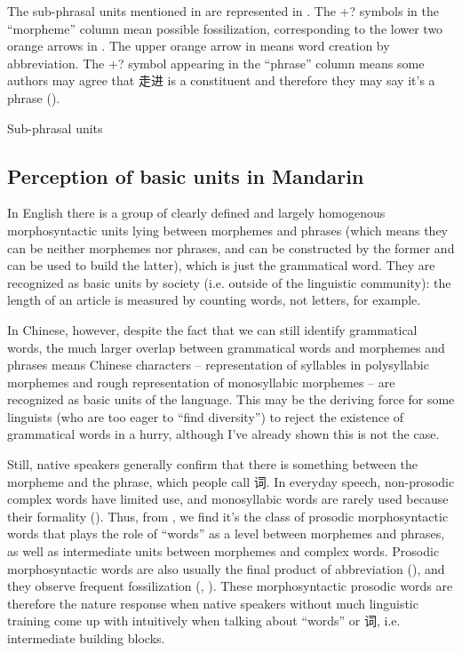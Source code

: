 \documentclass[UTF8, a4paper, oneside, scheme=plain, 12pt]{ctexrep}
\begin{document}
The sub-phrasal units mentioned in 
are represented in .
The +? symbols in the ``morpheme'' column 
mean possible fossilization, 
corresponding to the lower two orange arrows in .
The upper orange arrow in 
means word creation by abbreviation. 
The +? symbol appearing in the ``phrase'' column 
means some authors may agree that 走进 is a constituent 
and therefore they may say it's a phrase
().

\begin{sidewaystable}
    \centering
    \caption{Sub-phrasal units}
    \label{tbl:sub-phrasal-units}
    
\end{sidewaystable}

\subsection{Perception of basic units in Mandarin}\label{sec:pos.word.perception}

In English there is a group of clearly defined and largely homogenous morphosyntactic units 
lying between morphemes and phrases
(which means they can be neither morphemes nor phrases,
and can be constructed by the former and can be used to build the latter),
which is just the grammatical word.
They are recognized as basic units by society 
(i.e. outside of the linguistic community):
the length of an article is measured by counting words, not letters, for example.

In Chinese, however, despite the fact that 
we can still identify grammatical words,
the much larger overlap between grammatical words and morphemes and phrases
means Chinese characters -- representation of syllables in polysyllabic morphemes 
and rough representation of monosyllabic morphemes -- 
are recognized as basic units of the language.
This may be the deriving force for some linguists 
(who are too eager to ``find diversity'')
to reject the existence of grammatical words in a hurry,
although I've already shown this is not the case.

Still, native speakers generally 
confirm that there is something between the morpheme and the phrase, 
which people call 词.
In everyday speech, 
non-prosodic complex words have limited use, 
and monosyllabic words are rarely used 
because their formality ().  
Thus, from , 
we find it's the class of prosodic morphosyntactic words 
that plays the role of ``words''
as a level between morphemes and phrases,
as well as intermediate units between morphemes and complex words.
Prosodic morphosyntactic words 
are also usually the final product 
of abbreviation (),
and they observe frequent fossilization
(,
).
These morphosyntactic prosodic words are therefore the nature response 
when native speakers without much linguistic training 
come up with intuitively when talking about ``words'' or 词,
i.e. intermediate building blocks.
\end{document}
